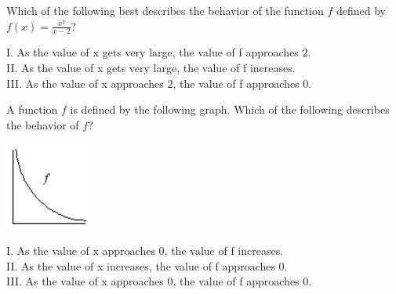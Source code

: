 \documentclass{ximera}
\newcommand{\recommendation}[1]{}
\newcommand{\PCA}[1]{}
\begin{document}



\begin{problem}
  \recommendation{Elizabeth}
  \PCA{\#25}

  Which of the following best describes the behavior of the function $f$
  defined by $f(x)=\frac{x^2}{x-2}$?

I. As the value of x gets very large, the value of f approaches 2.\\
II.  As the value of x gets very large, the value of f increases.\\
III.  As the value of x approaches 2, the value of f approaches 0.
  \begin{multipleChoice}
  \end{multipleChoice}
\end{problem}

\begin{problem}
\recommendation{Elizabeth}
\PCA{\#24}

A function $f$ is defined by the following graph.  Which of the
following describes the behavior of $f$?
\begin{image}
\includegraphics[scale = 1]{f}
\end{image}
 I.  As the value of x approaches 0, the value of f increases.\\
 II.  As the value of x increases, the value of f approaches 0.\\
 III.  As the value of x approaches 0, the value of f approaches 0.
  \begin{multipleChoice}
  \end{multipleChoice}
\end{problem}
\end{document}
